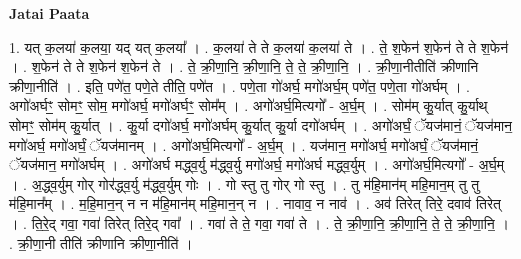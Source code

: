 \documentclass[17pt]{extarticle}
\begin{document}
\textbf{Jatai Paata} \newline

1. यत् क॒लया॑ क॒लया॒ यद् यत् क॒लया᳚ । . क॒लया॑ ते ते क॒लया॑ क॒लया॑ ते । . ते॒ श॒फेन॑ श॒फेन॑ ते ते श॒फेन॑ । . श॒फेन॑ ते ते श॒फेन॑ श॒फेन॑ ते । . ते॒ क्री॒णा॒नि॒ क्री॒णा॒नि॒ ते॒ ते॒ क्री॒णा॒नि॒ । . क्री॒णा॒नीतीति॑ क्रीणानि क्रीणा॒नीति॑ । . इति॒ पणे॑त॒ पणे॒ते तीति॒ पणे॑त । . पणे॒ता गो॑अर्घ॒ मगो॑अर्घ॒म् पणे॑त॒ पणे॒ता गो॑अर्घम् । . अगो॑अर्घꣳ॒॒ सोमꣳ॒॒ सोम॒ मगो॑अर्घ॒ मगो॑अर्घꣳ॒॒ सोम᳚म् । . अगो॑अर्घ॒मित्यगो᳚ - अ॒र्घ॒म् । . सोम॑म् कु॒र्यात् कु॒र्याथ् सोमꣳ॒॒ सोम॑म् कु॒र्यात् । . कु॒र्या दगो॑अर्घ॒ मगो॑अर्घम् कु॒र्यात् कु॒र्या दगो॑अर्घम् । . अगो॑अर्घं॒ ॅयज॑मानं॒ ॅयज॑मान॒ मगो॑अर्घ॒ मगो॑अर्घं॒ ॅयज॑मानम् । . अगो॑अर्घ॒मित्यगो᳚ - अ॒र्घ॒म् । . यज॑मान॒ मगो॑अर्घ॒ मगो॑अर्घं॒ ॅयज॑मानं॒ ॅयज॑मान॒ मगो॑अर्घम् । . अगो॑अर्घ मद्ध्व॒र्यु म॑द्ध्व॒र्यु मगो॑अर्घ॒ मगो॑अर्घ मद्ध्व॒र्युम् । . अगो॑अर्घ॒मित्यगो᳚ - अ॒र्घ॒म् । . अ॒द्ध्व॒र्युम् गोर् गोर॑द्ध्व॒र्यु म॑द्ध्व॒र्युम् गोः । . गो स्तु तु गोर् गो स्तु । . तु म॑हि॒मान॑म् महि॒मान॒म् तु तु म॑हि॒मान᳚म् । . म॒हि॒मान॒न् न न म॑हि॒मान॑म् महि॒मान॒न् न । . नावाव॒ न नाव॑ । . अव॑ तिरेत् तिरे॒ दवाव॑ तिरेत् । . ति॒रे॒द् गवा॒ गवा॑ तिरेत् तिरे॒द् गवा᳚ । . गवा॑ ते ते॒ गवा॒ गवा॑ ते । . ते॒ क्री॒णा॒नि॒ क्री॒णा॒नि॒ ते॒ ते॒ क्री॒णा॒नि॒ । . क्री॒णा॒नी तीति॑ क्रीणानि क्रीणा॒नीति॑ । \newline
\end{document}
